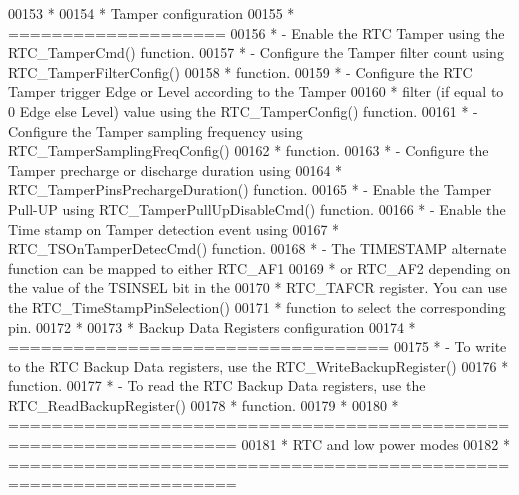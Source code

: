 \begin{DoxyCode}
00153 \textcolor{comment}{  *}
00154 \textcolor{comment}{  *          Tamper configuration}
00155 \textcolor{comment}{  *          ====================}
00156 \textcolor{comment}{  *            - Enable the RTC Tamper using the RTC\_TamperCmd() function.}
00157 \textcolor{comment}{  *             - Configure the Tamper filter count using RTC\_TamperFilterConfig()}
00158 \textcolor{comment}{  *              function. }
00159 \textcolor{comment}{  *            - Configure the RTC Tamper trigger Edge or Level according to the Tamper }
00160 \textcolor{comment}{  *              filter (if equal to 0 Edge else Level) value using the RTC\_TamperConfig() function.}
00161 \textcolor{comment}{  *            - Configure the Tamper sampling frequency using RTC\_TamperSamplingFreqConfig()}
00162 \textcolor{comment}{  *              function.}
00163 \textcolor{comment}{  *            - Configure the Tamper precharge or discharge duration using }
00164 \textcolor{comment}{  *              RTC\_TamperPinsPrechargeDuration() function.}
00165 \textcolor{comment}{  *            - Enable the Tamper Pull-UP using RTC\_TamperPullUpDisableCmd() function.}
00166 \textcolor{comment}{  *            - Enable the Time stamp on Tamper detection event using  }
00167 \textcolor{comment}{  *              RTC\_TSOnTamperDetecCmd() function.}
00168 \textcolor{comment}{  *            - The TIMESTAMP alternate function can be mapped to either RTC\_AF1 }
00169 \textcolor{comment}{  *              or RTC\_AF2 depending on the value of the TSINSEL bit in the }
00170 \textcolor{comment}{  *              RTC\_TAFCR register. You can use the  RTC\_TimeStampPinSelection()}
00171 \textcolor{comment}{  *              function to select the corresponding pin. }
00172 \textcolor{comment}{  *}
00173 \textcolor{comment}{  *          Backup Data Registers configuration}
00174 \textcolor{comment}{  *          ===================================}
00175 \textcolor{comment}{  *            - To write to the RTC Backup Data registers, use the RTC\_WriteBackupRegister()}
00176 \textcolor{comment}{  *              function.  }
00177 \textcolor{comment}{  *            - To read the RTC Backup Data registers, use the RTC\_ReadBackupRegister()}
00178 \textcolor{comment}{  *              function.}
00179 \textcolor{comment}{  * }
00180 \textcolor{comment}{  *          ===================================================================}
00181 \textcolor{comment}{  *                                  RTC and low power modes}
00182 \textcolor{comment}{  *          ===================================================================}

\end{DoxyCode}
